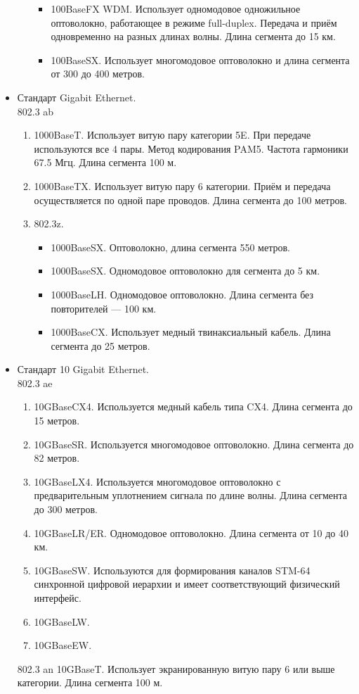 \documentclass[12pt, russian, oneside, article]{ncc}
\begin{document}
\begin{itemize}
\begin{enumerate}
\begin{itemize}
\item 100BaseFX WDM. Использует одномодовое одножильное оптоволокно, работающее в режиме full-duplex. Передача и приём одновременно на разных длинах волны. Длина сегмента до 15 км.
\item 100BaseSX. Использует многомодовое оптоволокно и длина сегмента от 300 до 400 метров.
\end{itemize}

\end{enumerate}


\item Стандарт Gigabit Ethernet.\\
\label{sec-5_2_1_2}%
802.3 ab
\begin{enumerate}
\item 1000BaseT. Использует витую пару категории 5E. При передаче используются все 4 пары. Метод кодирования PAM5. Частота гармоники 67.5 Мгц. Длина сегмента 100 м.
\item 1000BaseTX. Использует витую пару 6 категории. Приём и передача осуществляется по одной паре проводов. Длина сегмента до 100 метров.
\item 802.3z.

\begin{itemize}
\item 1000BaseSX. Оптоволокно, длина сегмента 550 метров.
\item 1000BaseSX. Одномодовое оптоволокно для сегмента до 5 км.
\item 1000BaseLH. Одномодовое оптоволокно. Длина сегмента без повторителей --- 100 км.
\item 1000BaseCX. Использует медный твинаксиальный кабель. Длина сегмента до 25 метров.
\end{itemize}

\end{enumerate}


\item Стандарт 10 Gigabit Ethernet.\\
\label{sec-5_2_1_3}%
802.3 ae
\begin{enumerate}
\item 10GBaseCX4. Используется медный кабель типа CX4. Длина сегмента до 15 метров.
\item 10GBaseSR. Используется многомодовое оптоволокно. Длина сегмента до 82 метров.
\item 10GBaseLX4. Используется многомодовое оптоволокно с предварительным уплотнением сигнала по длине волны. Длина сегмента до 300 метров.
\item 10GBaseLR/ER. Одномодовое оптоволокно. Длина сегмента от 10 до 40 км.
\item 10GBaseSW. Используются для формирования каналов STM-64 синхронной цифровой иерархии и имеет соответствующий физический интерфейс.
\item 10GBaseLW.
\item 10GBaseEW.
\end{enumerate}

802.3 an
10GBaseT. Использует экранированную витую пару 6 или выше категории. Длина сегмента 100 м. 

\end{itemize} %
\end{document}
